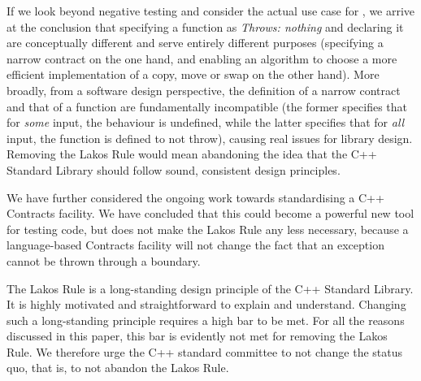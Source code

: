 If we look beyond negative testing and consider the actual use case for , we arrive at the conclusion that specifying a function as \emph{Throws: nothing} and declaring it  are conceptually different and serve entirely different purposes (specifying a narrow contract on the one hand, and enabling an algorithm to choose a more efficient implementation of a copy, move or swap on the other hand). More broadly, from a software design perspective, the definition of a narrow contract and that of a  function are fundamentally incompatible (the former specifies that for \emph{some} input, the behaviour is undefined, while the latter specifies that for \emph{all} input, the function is defined to not throw), causing real issues for library design. Removing the Lakos Rule would mean abandoning the idea that the C++ Standard Library should follow sound, consistent design principles.

We have further considered the ongoing work towards standardising a C++ Contracts facility. We have concluded that this could become a powerful new tool for testing code, but does not make the Lakos Rule any less necessary, because a language-based Contracts facility will not change the fact that an exception cannot be thrown through a  boundary.

The Lakos Rule is a long-standing design principle of the C++ Standard Library. It is highly motivated and straightforward to explain and understand. Changing such a long-standing principle requires a high bar to be met. For all the reasons discussed in this paper, this bar is evidently not met for removing the Lakos Rule. We therefore urge the C++ standard committee to not change the status quo, that is, to not abandon the Lakos Rule.





\renewcommand{\bibname}{References}




